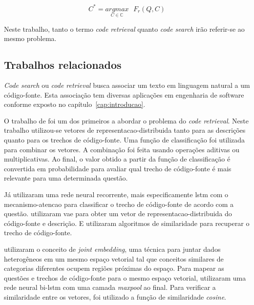 \begin{equation}\label{eq:code-retrieval}
C^{*} = \underset{C \in \mathbb{C}}{argmax}\text{ } F_{r}(Q , C)
\end{equation}

Neste trabalho, tanto o termo \textit{code retrieval} quanto \textit{code search} irão referir-se ao mesmo problema.

\subsection{Trabalhos relacionados}\label{sec:code-retrieval-trabalhos-relacionados}

\textit{Code search} ou \textit{code retrieval} busca associar um texto em linguagem natural a um código-fonte. Esta associação tem diversas aplicações em engenharia de software conforme exposto no capítulo~\ref{cap:introducao}.

O trabalho de \cite{Allamanis-bimodal-source-code-natural-language:2015} foi um dos primeiros a abordar o problema do \textit{code retrieval}. Neste trabalho utilizou-se vetores de \gls{representacao-distribuida} tanto para as descrições quanto para os trechos de código-fonte. Uma função de classificação foi utilizada para combinar os vetores. A combinação foi feita usando operações aditivas ou multiplicativas. Ao final, o valor obtido a partir da função de classificação é convertida em probabilidade para avaliar qual trecho de código-fonte é mais relevante para uma determinada questão.

Já \cite{iyer-etal-2016-summarizing} utilizaram uma rede neural recorrente, mais especificamente \acrshort{lstm} com o \gls{mecanismo-atencao} para classificar o trecho de código-fonte de acordo com a questão. \cite{Chen-bi-variational-autoencoder:2018} utilizaram \acrfull{vae} para obter um vetor de \gls{representacao-distribuida} do código-fonte e descrição. E utilizaram algoritmos de similaridade para recuperar o trecho de código-fonte.

\cite{Gu-deep-code-search:2018} utilizaram o conceito de \textit{joint embedding}, uma técnica para juntar dados heterogêneos em um mesmo espaço vetorial tal que conceitos similares de categorias diferentes ocupem regiões próximas do espaço. Para mapear as questões e trechos de código-fonte para o mesmo espaço vetorial, \cite{Gu-deep-code-search:2018} utilizaram uma rede neural bi-\acrshort{lstm} com uma camada \textit{maxpool} ao final. Para verificar a similaridade entre os vetores, foi utilizado a função de similaridade \textit{cosine}.

